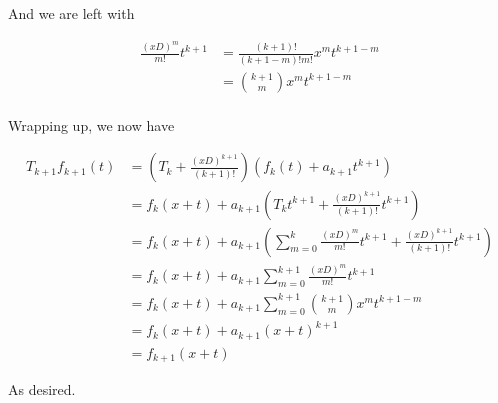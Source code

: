 And we are left with

\begin{align*}
\frac{(xD)^{m}}{m!} t^{k+1}
&=
\frac{(k+1)!}{(k + 1 - m)!m!} x^m t^{k + 1 -m} \\
&=
\binom{k+1}{m} x^m t^{k + 1 -m} \\
\end{align*}

Wrapping up, we now have

\begin{align*}
T_{k+1} f_{k+1}(t) 
&= 
\left( T_{k} + \frac{(xD)^{k+1}}{(k+1)!} \right) \left( f_{k}(t) + a_{k+1}t^{k+1} \right) \\
&=
f_{k}(x + t) 
+ a_{k+1}
\left( T_{k} t^{k+1} +\frac{(xD)^{k+1}}{(k+1)!} t^{k+1} \right)
\\
&=
f_{k}(x + t) 
+ a_{k+1}
\left( 
\sum_{m=0}^k \frac{(xD)^m}{m!} t^{k+1} +\frac{(xD)^{k+1}}{(k+1)!} t^{k+1} \right)
\\
&=
f_{k}(x + t) 
+ a_{k+1} \sum_{m=0}^{k+1} \frac{(xD)^m}{m!} t^{k+1}
\\
&=
f_{k}(x + t) 
+ a_{k+1} \sum_{m=0}^{k+1} \binom{k+1}{m} x^m t^{k + 1 -m} \\
&=
f_{k}(x + t) + a_{k+1} (x + t)^{k+1} \\
&=
f_{k+1}(x + t) 
\end{align*}

As desired.
